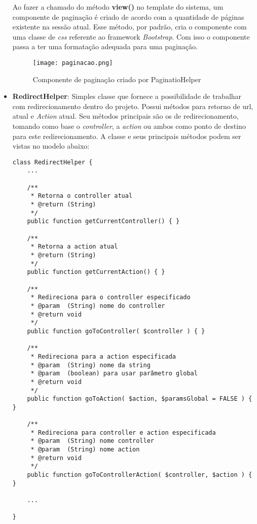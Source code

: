 \begin{itemize}
            Ao fazer a chamado do método \textbf{view()} no template do sistema, um componente de paginação é criado de acordo com a quantidade de páginas existente na sessão atual. Esse método, por padrão, cria o componente com uma classe de \emph{css} referente ao framework \emph{Bootstrap}. Com isso o componente passa a ter uma formatação adequada para uma paginação.

            \begin{figure}[!htb]
                \centering
                \texttt{[image: paginacao.png]}
                \caption{\small Componente de paginação criado por PaginatioHelper}
                \label{cap:paginaca}
            \end{figure}


            \item\textbf{RedirectHelper}: Simples classe que fornece a possibilidade de trabalhar com redirecionamento dentro do projeto. Possui métodos para retorno de url,  atual e \emph{Action} atual. Seu métodos principais são os de redirecionamento, tomando como base o \emph{controller}, a \emph{action} ou ambos como ponto de destino para este redirecionamento. A classe e seus principais métodos podem ser vistas no modelo abaixo:


\begin{lstlisting}
class RedirectHelper {
    ...

    /**
     * Retorna o controller atual
     * @return (String)
     */
    public function getCurrentController() { }

    /**
     * Retorna a action atual
     * @return (String)
     */
    public function getCurrentAction() { }

    /**
     * Redireciona para o controller especificado
     * @param  (String) nome do controller
     * @return void
     */
    public function goToController( $controller ) { }

    /**
     * Redireciona para a action especificada
     * @param  (String) nome da string
     * @param  (boolean) para usar parâmetro global
     * @return void
     */
    public function goToAction( $action, $paramsGlobal = FALSE ) { }

    /**
     * Redireciona para controller e action especificada
     * @param  (String) nome controller
     * @param  (String) nome action
     * @return void
     */
    public function goToControllerAction( $controller, $action ) { }

    ...

}
\end{lstlisting}

            \end{itemize}



